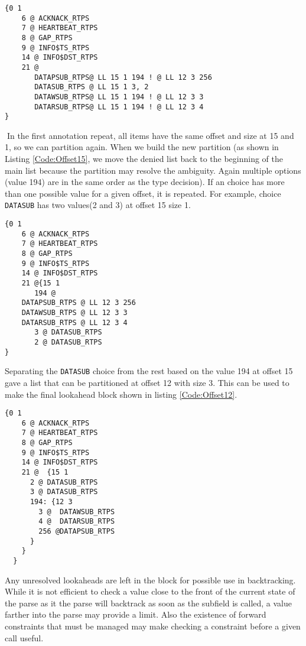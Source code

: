 \documentclass[12pt,oneside,letterpaper]{article}
\begin{document}
\begin{lstlisting}[language=SCL2,style=mystyle,frame=none,float,
caption=Offset 12 Moved,label=Code:Offset12Moved, xleftmargin=3.5ex]
{0 1
    6 @ ACKNACK_RTPS
    7 @ HEARTBEAT_RTPS
    8 @ GAP_RTPS
    9 @ INFO$TS_RTPS
    14 @ INFO$DST_RTPS
    21 @
       DATAPSUB_RTPS@ LL 15 1 194 ! @ LL 12 3 256
       DATASUB_RTPS @ LL 15 1 3, 2 
       DATAWSUB_RTPS@ LL 15 1 194 ! @ LL 12 3 3
       DATARSUB_RTPS@ LL 15 1 194 ! @ LL 12 3 4
}
\end{lstlisting}
In the first annotation repeat, all items have the same offset and size at 15 and 1, so we can partition again.
When we build the new partition (as shown in Listing \ref{Code:Offset15}, we move the denied list back to the beginning of the main list because the partition may resolve the ambiguity.
Again multiple options (value 194) are in the same order as the type decision). If an choice has more than one possible value for a given offset, it is repeated. For example, choice \texttt{DATASUB} has two values(2 and 3) at offset 15 size 1.

\begin{lstlisting}[language=SCL2,style=mystyle,frame=none,float,
caption=Offset 15 Partition,label=Code:Offset15, xleftmargin=3.5ex]
{0 1
    6 @ ACKNACK_RTPS
    7 @ HEARTBEAT_RTPS
    8 @ GAP_RTPS
    9 @ INFO$TS_RTPS
    14 @ INFO$DST_RTPS
    21 @{15 1
       194 @
	DATAPSUB_RTPS @ LL 12 3 256
	DATAWSUB_RTPS @ LL 12 3 3
	DATARSUB_RTPS @ LL 12 3 4
       3 @ DATASUB_RTPS
       2 @ DATASUB_RTPS
}
\end{lstlisting}

Separating the \texttt{DATASUB} choice from the rest based on the value 194 at offset 15 gave a list that can be partitioned at offset 12 with size 3.
This can  be used to make the final lookahead block shown in listing \ref{Code:Offset12}.

\begin{lstlisting}[language=SCL2,style=mystyle,frame=none,float,
caption=Offset 12 Parittioned,label=Code:Offset12, xleftmargin=3.5ex]
  {0 1
    6 @ ACKNACK_RTPS
    7 @ HEARTBEAT_RTPS
    8 @ GAP_RTPS
    9 @ INFO$TS_RTPS
    14 @ INFO$DST_RTPS
    21 @  {15 1
      2 @ DATASUB_RTPS
      3 @ DATASUB_RTPS
      194: {12 3
        3 @  DATAWSUB_RTPS
        4 @  DATARSUB_RTPS
        256 @DATAPSUB_RTPS
      }
    }
  }
\end{lstlisting}

Any unresolved lookaheads are left in the block for possible use in backtracking. While it is not efficient to check a value close to the front of the current state of the parse as it the parse will backtrack as soon as the subfield is called, a value farther into the parse may provide a limit. Also the existence of forward constraints that must be managed may make checking a constraint before a given call useful.
\end{document}
